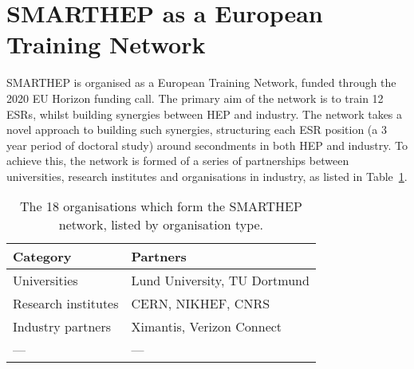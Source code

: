\section{SMARTHEP as a European Training Network}
\label{network}
SMARTHEP is organised as a European Training Network, funded through the 2020 EU Horizon funding call. The primary aim of the network is to train 12 ESRs, whilst building synergies between HEP and industry. The network takes a novel approach to building such synergies, structuring each ESR position (a 3 year period of doctoral study) around secondments in both HEP and industry. To achieve this, the network is formed of a series of partnerships between universities, research institutes and organisations in industry, as listed in Table~\ref{partners}.

\begin{table}[h!]
    \centering
    \caption{The 18 organisations which form the SMARTHEP network, listed by organisation type.}
    \label{partners}       
    \begin{tabular}{ll}
    \hline
    Category & Partners \\\hline
    Universities        & Lund University, TU Dortmund \\
    Research institutes & CERN, NIKHEF, CNRS \\
    Industry partners   & Ximantis, Verizon Connect \\
    --- & --- \\\hline
    \end{tabular}
\end{table}

